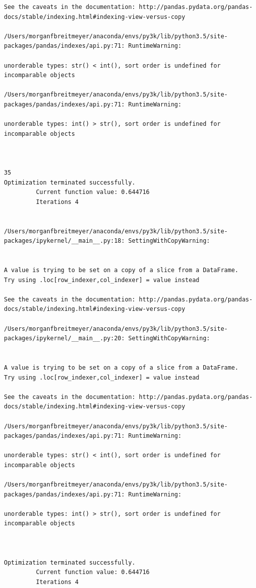 \begin{lstlisting}
See the caveats in the documentation: http://pandas.pydata.org/pandas-docs/stable/indexing.html#indexing-view-versus-copy

/Users/morganfbreitmeyer/anaconda/envs/py3k/lib/python3.5/site-packages/pandas/indexes/api.py:71: RuntimeWarning:

unorderable types: str() < int(), sort order is undefined for incomparable objects

/Users/morganfbreitmeyer/anaconda/envs/py3k/lib/python3.5/site-packages/pandas/indexes/api.py:71: RuntimeWarning:

unorderable types: int() > str(), sort order is undefined for incomparable objects



35
Optimization terminated successfully.
         Current function value: 0.644716
         Iterations 4


/Users/morganfbreitmeyer/anaconda/envs/py3k/lib/python3.5/site-packages/ipykernel/__main__.py:18: SettingWithCopyWarning:


A value is trying to be set on a copy of a slice from a DataFrame.
Try using .loc[row_indexer,col_indexer] = value instead

See the caveats in the documentation: http://pandas.pydata.org/pandas-docs/stable/indexing.html#indexing-view-versus-copy

/Users/morganfbreitmeyer/anaconda/envs/py3k/lib/python3.5/site-packages/ipykernel/__main__.py:20: SettingWithCopyWarning:


A value is trying to be set on a copy of a slice from a DataFrame.
Try using .loc[row_indexer,col_indexer] = value instead

See the caveats in the documentation: http://pandas.pydata.org/pandas-docs/stable/indexing.html#indexing-view-versus-copy

/Users/morganfbreitmeyer/anaconda/envs/py3k/lib/python3.5/site-packages/pandas/indexes/api.py:71: RuntimeWarning:

unorderable types: str() < int(), sort order is undefined for incomparable objects

/Users/morganfbreitmeyer/anaconda/envs/py3k/lib/python3.5/site-packages/pandas/indexes/api.py:71: RuntimeWarning:

unorderable types: int() > str(), sort order is undefined for incomparable objects



Optimization terminated successfully.
         Current function value: 0.644716
         Iterations 4



\end{lstlisting}
